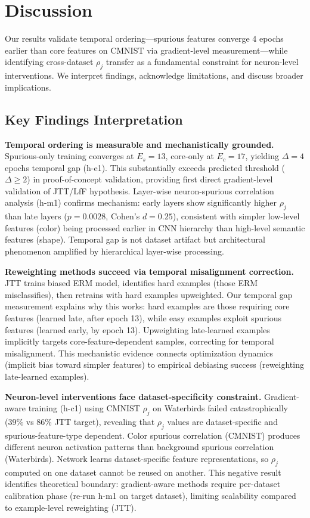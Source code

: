 \section{Discussion}
\label{sec:discussion}

Our results validate temporal ordering---spurious features converge 4 epochs earlier than core features on CMNIST via gradient-level measurement---while identifying cross-dataset $\rho_j$ transfer as a fundamental constraint for neuron-level interventions. We interpret findings, acknowledge limitations, and discuss broader implications.

\subsection{Key Findings Interpretation}

\textbf{Temporal ordering is measurable and mechanistically grounded.} Spurious-only training converges at $E_s=13$, core-only at $E_c=17$, yielding $\Delta=4$ epochs temporal gap (h-e1). This substantially exceeds predicted threshold ($\Delta \geq 2$) in proof-of-concept validation, providing first direct gradient-level validation of JTT/LfF hypothesis. Layer-wise neuron-spurious correlation analysis (h-m1) confirms mechanism: early layers show significantly higher $\rho_j$ than late layers ($p=0.0028$, Cohen's $d=0.25$), consistent with simpler low-level features (color) being processed earlier in CNN hierarchy than high-level semantic features (shape). Temporal gap is not dataset artifact but architectural phenomenon amplified by hierarchical layer-wise processing.

\textbf{Reweighting methods succeed via temporal misalignment correction.} JTT trains biased ERM model, identifies hard examples (those ERM misclassifies), then retrains with hard examples upweighted. Our temporal gap measurement explains why this works: hard examples are those requiring core features (learned late, after epoch 13), while easy examples exploit spurious features (learned early, by epoch 13). Upweighting late-learned examples implicitly targets core-feature-dependent samples, correcting for temporal misalignment. This mechanistic evidence connects optimization dynamics (implicit bias toward simpler features) to empirical debiasing success (reweighting late-learned examples).

\textbf{Neuron-level interventions face dataset-specificity constraint.} Gradient-aware training (h-c1) using CMNIST $\rho_j$ on Waterbirds failed catastrophically (39\% vs 86\% JTT target), revealing that $\rho_j$ values are dataset-specific and spurious-feature-type dependent. Color spurious correlation (CMNIST) produces different neuron activation patterns than background spurious correlation (Waterbirds). Network learns dataset-specific feature representations, so $\rho_j$ computed on one dataset cannot be reused on another. This negative result identifies theoretical boundary: gradient-aware methods require per-dataset calibration phase (re-run h-m1 on target dataset), limiting scalability compared to example-level reweighting (JTT).


